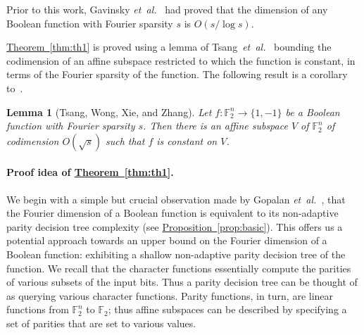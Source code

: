 \documentclass[11pt]{article}
\numberwithin{equation}{section}
\newtheorem{lemma}[theorem]{Lemma}
\theoremstyle{definition}
\theoremstyle{plain}
\newcommand{\etal}{{\it et~al.}}
\newcommand{\lref}[2][]{\hyperref[#2]{#1~\ref*{#2}}}
\newcommand{\F}{{\mathbb F}}
\begin{document}
Prior to this work, Gavinsky \etal~\cite{alex} had proved that the dimension of any Boolean function with Fourier sparsity $s$ is $O(s/\log s)$.

\lref[Theorem]{thm:th1} is proved using a lemma of
Tsang~\etal~\cite{tsang} bounding the codimension of an affine subspace
restricted to which the function is constant, in terms of the
Fourier sparsity of the function.
%
The following result is a corollary to~\cite[Lemma~28]{tsang}.
%
\begin{lemma}[Tsang, Wong, Xie, and Zhang]
\label{lem:set}
Let $f:\mathbb{F}_2^n \rightarrow \{1,-1\}$ be a Boolean function
with Fourier sparsity $s$. Then there is an affine subspace $V$ of $\mathbb{F}_2^n$ of codimension $O(\sqrt{s})$ such
that $f$ is constant on $V$.
\end{lemma}
%
\paragraph{Proof idea of \lref[Theorem]{thm:th1}.}
%
We begin
%
with  %
a simple but crucial
observation made by Gopalan \etal~\cite{DBLP:journals/siamcomp/GopalanOSSW11}, that the Fourier dimension of a Boolean function is
equivalent to its non-adaptive parity decision tree complexity (see
\lref[Proposition]{prop:basic}). This offers us a potential approach
towards
%
an upper bound on  %
the Fourier dimension of a Boolean function:
exhibiting a shallow non-adaptive parity decision tree of the
function. We recall that the character functions essentially compute the parities of various subsets of the input bits. Thus a parity decision tree can be thought of as querying various character functions. Parity functions, in turn, are linear functions from $\F_2^n$ to $\F_2$; thus affine subspaces can be described by specifying a set of parities that are set to various values.
\end{document}
